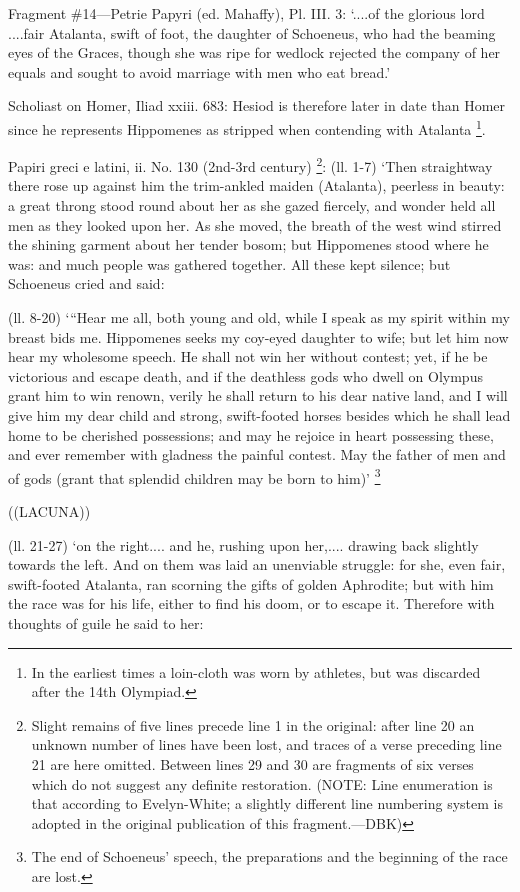 Fragment \#14—Petrie Papyri (ed. Mahaffy), Pl. III. 3: ‘....of the
glorious lord ....fair Atalanta, swift of foot, the daughter of Schoeneus, who
had the beaming eyes of the Graces, though she was ripe for wedlock rejected
the company of her equals and sought to avoid marriage with men who eat
bread.’

Scholiast on Homer, Iliad xxiii. 683: Hesiod is therefore later in date than
Homer since he represents Hippomenes as stripped when contending with Atalanta
\footnote{In the earliest times a
loin-cloth was worn by athletes, but was discarded after the 14th Olympiad.}.

Papiri greci e latini, ii. No. 130 (2nd-3rd century) \footnote{Slight remains of five
lines precede line 1 in the original: after line 20 an unknown number of lines
have been lost, and traces of a verse preceding line 21 are here omitted.
Between lines 29 and 30 are fragments of six verses which do not suggest any
definite restoration. (NOTE: Line enumeration is that according to
Evelyn-White; a slightly different line numbering system is adopted in the
original publication of this fragment.—DBK)}: (ll.
1-7) ‘Then straightway there rose up against him the trim-ankled maiden
(Atalanta), peerless in beauty: a great throng stood round about her as she
gazed fiercely, and wonder held all men as they looked upon her. As she moved,
the breath of the west wind stirred the shining garment about her tender bosom;
but Hippomenes stood where he was: and much people was gathered together. All
these kept silence; but Schoeneus cried and said:

(ll. 8-20) ‘“Hear me all, both young and old, while I speak as my
spirit within my breast bids me. Hippomenes seeks my coy-eyed daughter to wife;
but let him now hear my wholesome speech. He shall not win her without contest;
yet, if he be victorious and escape death, and if the deathless gods who dwell
on Olympus grant him to win renown, verily he shall return to his dear native
land, and I will give him my dear child and strong, swift-footed horses besides
which he shall lead home to be cherished possessions; and may he rejoice in
heart possessing these, and ever remember with gladness the painful contest.
May the father of men and of gods (grant that splendid children may be born to
him)’ \footnote{The end of
Schoeneus’ speech, the preparations and the beginning of the race are
lost.}

((LACUNA))

(ll. 21-27) ‘on the right.... and he, rushing upon her,.... drawing back
slightly towards the left. And on them was laid an unenviable struggle: for
she, even fair, swift-footed Atalanta, ran scorning the gifts of golden
Aphrodite; but with him the race was for his life, either to find his doom, or
to escape it. Therefore with thoughts of guile he said to her:

